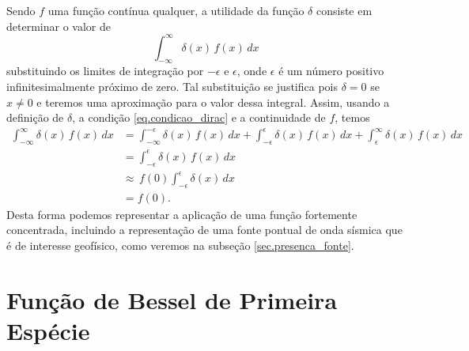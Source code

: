 Sendo $f$ uma fun\c{c}\~ao cont\'inua qualquer, a utilidade da fun\c{c}\~ao $\delta$ consiste em determinar o valor de 
\begin{equation}
\int_{-\infty}^{\infty}\delta(x)\,f(x)\,dx
\end{equation}
substituindo os limites de integra\c{c}\~ao por $-\epsilon$ e $\epsilon$, onde $\epsilon$ \'e um n\'umero positivo infinitesimalmente pr\'oximo de zero. Tal substitui\c{c}\~ao se justifica pois $\delta=0$ se $x\neq0$ e teremos uma aproxima\c{c}\~ao para o valor dessa integral. Assim, usando a defini\c{c}\~ao de $\delta$, a condi\c{c}\~ao \ref{eq.condicao_dirac} e a continuidade de $f$, temos
\begin{align*}
\int_{-\infty}^{\infty}\delta(x)\,f(x)\,dx&=\int_{-\infty}^{-\epsilon}\delta(x)\,f(x)\,dx+\int_{-\epsilon}^{\epsilon}\delta(x)\,f(x)\,dx+\int_{\epsilon}^{\infty}\delta(x)\,f(x)\,dx\\
&=\int_{-\epsilon}^{\epsilon}\delta(x)\,f(x)\,dx\\
&\approx\,f(0)\int_{-\epsilon}^{\epsilon}\delta(x)\,dx\\
&=f(0).
\end{align*}
Desta forma podemos representar a aplica\c{c}\~ao de uma fun\c{c}\~ao fortemente concentrada, incluindo a representa\c{c}\~ao de uma fonte pontual de onda s\'ismica que \'e de interesse geof\'isico, como veremos na subse\c{c}\~ao \ref{sec.presenca_fonte}.

\section{Fun\c{c}\~ao de Bessel de Primeira Esp\'ecie}

